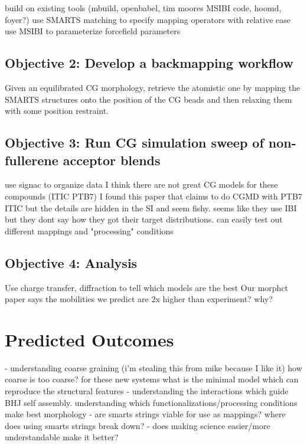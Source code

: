 build on existing tools (mbuild, openbabel, tim moores MSIBI code, hoomd, foyer?)
use SMARTS matching to specify mapping operators with relative ease
use MSIBI to parameterize forcefield parameters

\subsection*{Objective 2: Develop a backmapping workflow}

Given an equilibrated CG morphology, retrieve the atomistic one by mapping the SMARTS structures onto the position of the CG beads and then relaxing them with some position restraint. 

\subsection*{Objective 3: Run CG simulation sweep of non-fullerene acceptor blends}

use signac to organize data
I think there are not great CG models for these compounds (ITIC PTB7) I found this paper \cite{Meng2019} that claims to do CGMD with PTB7 ITIC but the details are hidden in the SI and seem fishy. seems like they use IBI but they dont say how they got their target distributions.
can easily test out different mappings and "processing" conditions

\subsection*{Objective 4: Analysis}

Use charge transfer, diffraction to tell which models are the best
Our morphct paper says the mobilities we predict are 2x higher than experiment? why?


\section*{Predicted Outcomes}

- understanding coarse graining (i'm stealing this from mike because I like it) how coarse is too coarse? for these new systems what is the minimal model which can reproduce the structural features
- understanding the interactions which guide BHJ self assembly. understanding which functionalizations/processing conditions make best morphology
- are smarts strings viable for use as mappings? where does using smarts strings break down?
- does making science easier/more understandable make it better? 


